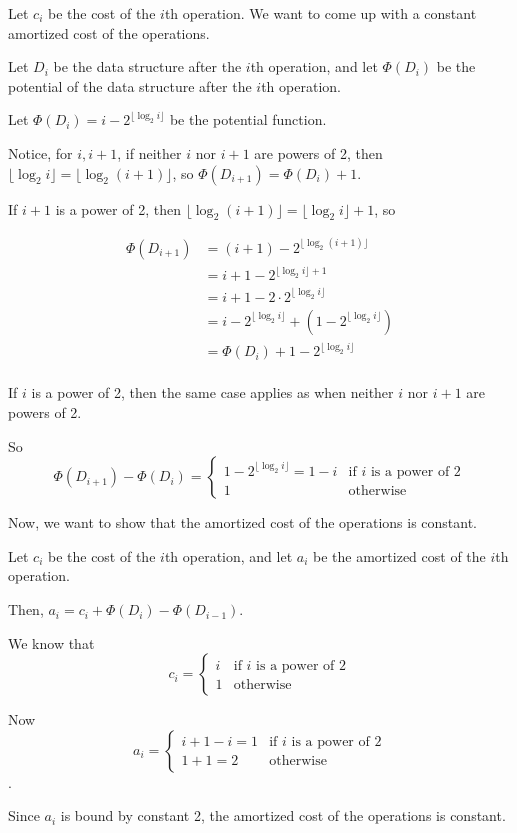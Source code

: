 \documentclass[a4paper,12pt]{article}
\begin{document}
Let $c_i$ be the cost of the $i$th operation. We want to come up with a constant amortized cost of the operations.

Let $D_i$ be the data structure after the $i$th operation, and let $\Phi(D_i)$ be the potential of the data structure after the $i$th operation.

Let $\Phi(D_i) = i - 2^{\lfloor \log_2 i \rfloor}$ be the potential function.

Notice, for $i, i+1$, if neither $i$ nor $i+1$ are powers of 2, then $\lfloor \log_2 i \rfloor = \lfloor \log_2 (i+1) \rfloor$, so $\Phi(D_{i+1}) = \Phi(D_i) + 1$.

If $i + 1$ is a power of 2, then $\lfloor \log_2 (i+1) \rfloor = \lfloor \log_2 i \rfloor + 1$, so

$$\begin{aligned}
\Phi(D_{i+1}) &= (i+1) - 2^{\lfloor \log_2 (i+1) \rfloor} \\
&= i + 1 - 2^{\lfloor \log_2 i \rfloor + 1} \\
&= i + 1 - 2 \cdot 2^{\lfloor \log_2 i \rfloor} \\
&= i - 2^{\lfloor \log_2 i \rfloor} + (1 - 2^{\lfloor \log_2 i \rfloor}) \\
&= \Phi(D_i) + 1 - 2^{\lfloor \log_2 i \rfloor} \\
\end{aligned}$$


If $i$ is a power of 2, then the same case applies as when neither $i$ nor $i+1$ are powers of 2.

So $$\Phi(D_{i+1}) - \Phi(D_i) = \begin{cases}
    1 - 2^{\lfloor \log_2 i \rfloor} = 1 - i & \text{if } i \text{ is a power of 2} \\
    1 & \text{otherwise}
\end{cases}$$

Now, we want to show that the amortized cost of the operations is constant.

Let $c_i$ be the cost of the $i$th operation, and let $a_i$ be the amortized cost of the $i$th operation.

Then, $a_i = c_i + \Phi(D_i) - \Phi(D_{i-1})$.

We know that $$c_i = \begin{cases}
   i & \text{if } i \text{ is a power of 2} \\
   1 & \text{otherwise}
  \end{cases}$$

Now $$a_i = \begin{cases}
    i + 1 - i = 1 & \text{if } i \text{ is a power of 2} \\
    1 + 1 = 2 & \text{otherwise}
\end{cases}$$.

Since $a_i$ is bound by constant 2, the amortized cost of the operations is constant.
\end{document}
